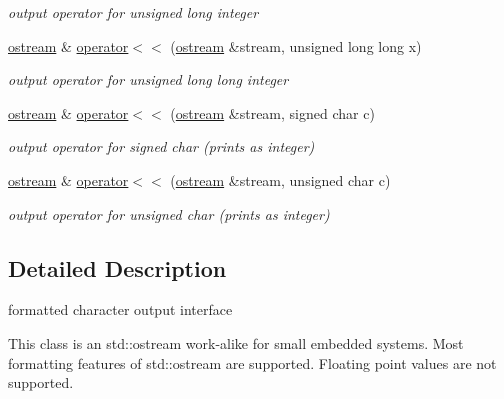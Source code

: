 \begin{DoxyCompactItemize}
\begin{DoxyCompactList}\small\item\em output operator for unsigned long integer \end{DoxyCompactList}\item 
\mbox{\label{classhwlib_1_1ostream_a7ab00ab622e0e7c42198f34597713390}} 
\hyperlink{classhwlib_1_1ostream}{ostream} \& \hyperlink{classhwlib_1_1ostream_a7ab00ab622e0e7c42198f34597713390}{operator$<$$<$} (\hyperlink{classhwlib_1_1ostream}{ostream} \&stream, unsigned long long x)
\begin{DoxyCompactList}\small\item\em output operator for unsigned long long integer \end{DoxyCompactList}\item 
\mbox{\label{classhwlib_1_1ostream_a62d3d656e6a5021fc4a6aa6940b5641e}} 
\hyperlink{classhwlib_1_1ostream}{ostream} \& \hyperlink{classhwlib_1_1ostream_a62d3d656e6a5021fc4a6aa6940b5641e}{operator$<$$<$} (\hyperlink{classhwlib_1_1ostream}{ostream} \&stream, signed char c)
\begin{DoxyCompactList}\small\item\em output operator for signed char (prints as integer) \end{DoxyCompactList}\item 
\mbox{\label{classhwlib_1_1ostream_a3fea1f54c018fe926d9c7ee25ebd917a}} 
\hyperlink{classhwlib_1_1ostream}{ostream} \& \hyperlink{classhwlib_1_1ostream_a3fea1f54c018fe926d9c7ee25ebd917a}{operator$<$$<$} (\hyperlink{classhwlib_1_1ostream}{ostream} \&stream, unsigned char c)
\begin{DoxyCompactList}\small\item\em output operator for unsigned char (prints as integer) \end{DoxyCompactList}\end{DoxyCompactItemize}


\subsection{Detailed Description}
formatted character output interface

This class is an std\+::ostream work-\/alike for small embedded systems. Most formatting features of std\+::ostream are supported. Floating point values are not supported.

